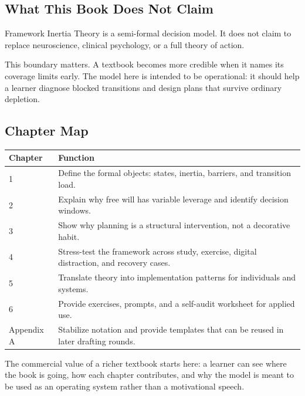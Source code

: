 \subsection{What This Book Does Not Claim}

\begin{assumption}
Framework Inertia Theory is a semi-formal decision model. It does not claim to
replace neuroscience, clinical psychology, or a full theory of action.
\end{assumption}

\begin{remark}
This boundary matters. A textbook becomes more credible when it names its
coverage limits early. The model here is intended to be operational: it should
help a learner diagnose blocked transitions and design plans that survive
ordinary depletion.
\end{remark}

\subsection{Chapter Map}

\begin{longtable}{@{}p{} p{}@{}}
\toprule
\textbf{Chapter} & \textbf{Function} \\
\midrule
1 & Define the formal objects: states, inertia, barriers, and transition load. \\
2 & Explain why free will has variable leverage and identify decision windows. \\
3 & Show why planning is a structural intervention, not a decorative habit. \\
4 & Stress-test the framework across study, exercise, digital distraction, and recovery cases. \\
5 & Translate theory into implementation patterns for individuals and systems. \\
6 & Provide exercises, prompts, and a self-audit worksheet for applied use. \\
Appendix A & Stabilize notation and provide templates that can be reused in later drafting rounds. \\
\bottomrule
\end{longtable}

\begin{summarybox}
The commercial value of a richer textbook starts here: a learner can see where
the book is going, how each chapter contributes, and why the model is meant to
be used as an operating system rather than a motivational speech.
\end{summarybox}

